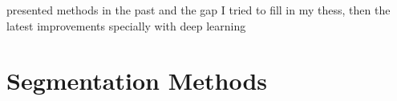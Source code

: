 %
%
%
%
%






presented methods in the past and the gap I tried to fill in my thess, then the latest improvements specially with deep learning



\section{Segmentation Methods} \label{sec:Segmentation}

